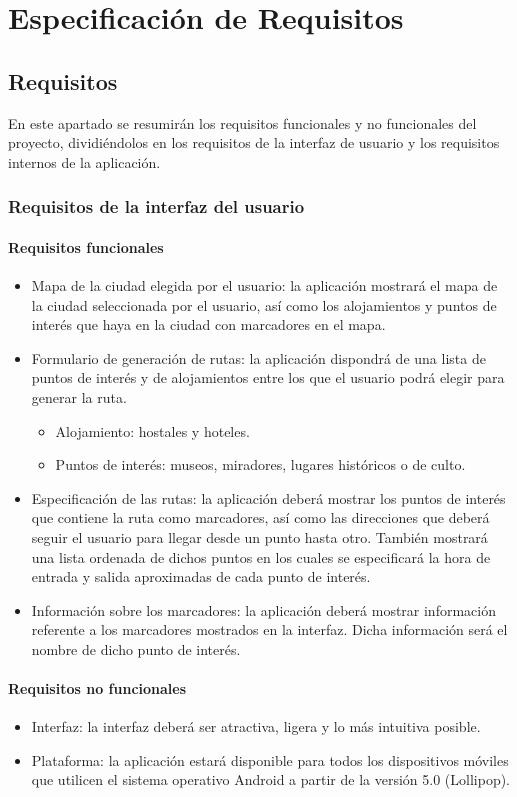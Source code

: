 \chapter{Especificación de  Requisitos}
\section[Requisitos]{Requisitos}
En este apartado se resumirán los requisitos funcionales y no funcionales del proyecto, dividiéndolos en los requisitos de la interfaz de usuario y los requisitos internos de la aplicación.
\subsection[Requisitos interfaz]{Requisitos de la interfaz del usuario}
\subsubsection[Requisitos funcionales]{Requisitos funcionales}
\begin{itemize}
	\item Mapa de la ciudad elegida por el usuario: la aplicación mostrará el mapa de la ciudad seleccionada por el usuario, así como los alojamientos y puntos de interés que haya en la ciudad con marcadores en el mapa.
	\item Formulario de generación de rutas: la aplicación dispondrá de una lista de puntos de interés y de alojamientos entre los que el usuario podrá elegir para generar la ruta. 
	\begin{itemize}
		\item Alojamiento: hostales y hoteles.
		\item Puntos de interés: museos, miradores, lugares históricos o de culto.
	\end{itemize}
	\item Especificación de las rutas: la aplicación deberá mostrar los puntos de interés que contiene la ruta como marcadores, así como las direcciones que deberá seguir el usuario para llegar desde un punto hasta otro. También mostrará una lista ordenada de dichos puntos en los cuales se especificará la hora de entrada y salida aproximadas de cada punto de interés.
	\item Información sobre los marcadores: la aplicación deberá mostrar información referente a los marcadores mostrados en la interfaz. Dicha información será el nombre de dicho punto de interés.
\end{itemize}
\subsubsection[Requisitos no funcionales]{Requisitos no funcionales}
\begin{itemize}
	\item Interfaz: la interfaz deberá ser atractiva, ligera y lo más intuitiva posible.
	\item Plataforma: la aplicación estará disponible para todos los dispositivos móviles que utilicen el sistema operativo Android a partir de la versión 5.0 (Lollipop).
\end{itemize}


